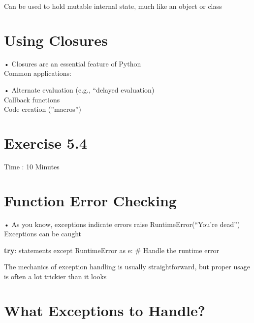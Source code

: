 \documentclass[
  letterpaper,
  DIV=11,
  numbers=noendperiod]{scrreprt}
\newenvironment{Shaded}{\begin{snugshade}}{\end{snugshade}}
\newcommand{\ControlFlowTok}[1]{\textcolor[rgb]{0.00,0.23,0.31}{\textbf{#1}}}
\newcommand{\ImportTok}[1]{\textcolor[rgb]{0.00,0.46,0.62}{#1}}
\newcommand{\NormalTok}[1]{\textcolor[rgb]{0.00,0.23,0.31}{#1}}
\newcommand{\OperatorTok}[1]{\textcolor[rgb]{0.37,0.37,0.37}{#1}}
\begin{document}
Can be used to hold mutable internal state, much like an object or class


\chapter{Using Closures}\label{using-closures}

• Closures are an essential feature of Python\\
Common applications:

• Alternate evaluation (e.g., ``delayed evaluation)\\
Callback functions\\
Code creation (''macros'')


\chapter{Exercise 5.4}\label{exercise-5.4}

Time : 10 Minutes


\chapter{Function Error Checking}\label{function-error-checking}

• As you know, exceptions indicate errors raise RuntimeError(``You're
dead'')\\
Exceptions can be caught

\begin{Shaded}
\begin{Highlighting}[]
\ControlFlowTok{try}\OperatorTok{:}\NormalTok{ statements except RuntimeError }\ImportTok{as}\NormalTok{ e}\OperatorTok{:}\NormalTok{ \# Handle the runtime error }
\end{Highlighting}
\end{Shaded}

The mechanics of exception handling is usually straightforward, but
proper usage is often a lot trickier than it looks


\chapter{What Exceptions to Handle?}\label{what-exceptions-to-handle}
\end{document}
